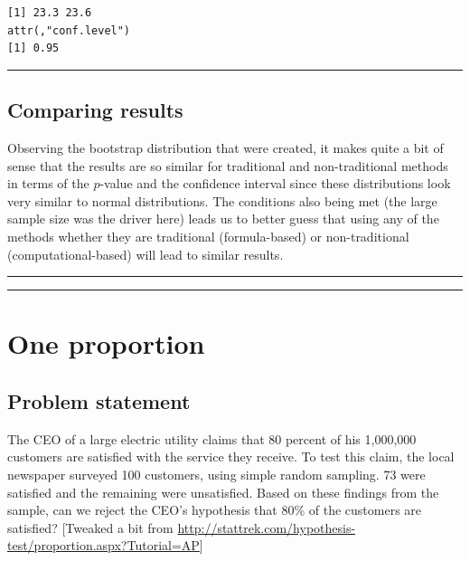 \documentclass[12pt,]{krantz}
\begin{document}
\begin{verbatim}
[1] 23.3 23.6
attr(,"conf.level")
[1] 0.95
\end{verbatim}

\begin{center}\rule{0.5\linewidth}{\linethickness}\end{center}

\subsection{Comparing results}\label{comparing-results}

Observing the bootstrap distribution that were created, it makes quite a
bit of sense that the results are so similar for traditional and
non-traditional methods in terms of the \(p\)-value and the confidence
interval since these distributions look very similar to normal
distributions. The conditions also being met (the large sample size was
the driver here) leads us to better guess that using any of the methods
whether they are traditional (formula-based) or non-traditional
(computational-based) will lead to similar results.

\begin{center}\rule{0.5\linewidth}{\linethickness}\end{center}

\begin{center}\rule{0.5\linewidth}{\linethickness}\end{center}

\section{One proportion}\label{one-proportion}

\subsection{Problem statement}\label{problem-statement-1}

The CEO of a large electric utility claims that 80 percent of his
1,000,000 customers are satisfied with the service they receive. To test
this claim, the local newspaper surveyed 100 customers, using simple
random sampling. 73 were satisfied and the remaining were unsatisfied.
Based on these findings from the sample, can we reject the CEO's
hypothesis that 80\% of the customers are satisfied? {[}Tweaked a bit
from
\url{http://stattrek.com/hypothesis-test/proportion.aspx?Tutorial=AP}{]}
\end{document}
